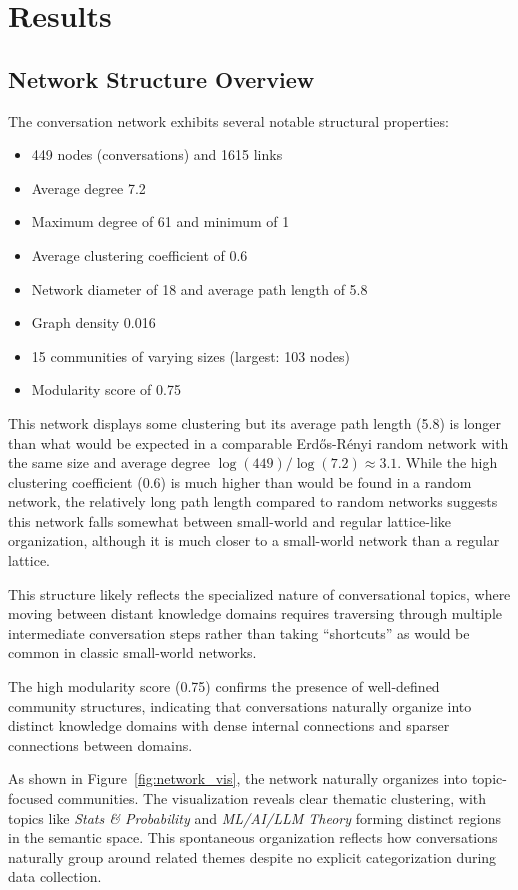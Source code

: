 \documentclass[10pt, a4paper]{article}
\begin{document}
\section{Results}

\subsection{Network Structure Overview}

The conversation network exhibits several notable structural properties:
\begin{itemize}
    \item 449 nodes (conversations) and 1615 links
    \item Average degree 7.2
    \item Maximum degree of 61 and minimum of 1
    \item Average clustering coefficient of 0.6
    \item Network diameter of 18 and average path length of 5.8
    \item Graph density 0.016
    \item 15 communities of varying sizes (largest: 103 nodes)
    \item Modularity score of 0.75
\end{itemize}


This network displays some clustering but its average path length (5.8) is longer than what would be expected in a comparable Erdős-Rényi random network with the same size and average degree $\log(449)/\log(7.2) \approx 3.1$. While the high clustering coefficient (0.6) is much higher than would be found in a random network, the relatively long path length compared to random networks suggests this network falls somewhat between small-world and regular lattice-like organization, although it is much closer to a small-world network than a regular lattice.

This structure likely reflects the specialized nature of conversational topics, where moving between distant knowledge domains requires traversing through multiple intermediate conversation steps rather than taking ``shortcuts'' as would be common in classic small-world networks.

The high modularity score (0.75) confirms the presence of well-defined community structures, indicating that conversations naturally organize into distinct knowledge domains with dense internal connections and sparser connections between domains.

As shown in Figure~\ref{fig:network_vis}, the network naturally organizes into topic-focused communities. The visualization reveals clear thematic clustering, with topics like \emph{Stats \& Probability} and \emph{ML/AI/LLM Theory} forming distinct regions in the semantic space. This spontaneous organization reflects how conversations naturally group around related themes despite no explicit categorization during data collection.
\end{document}
